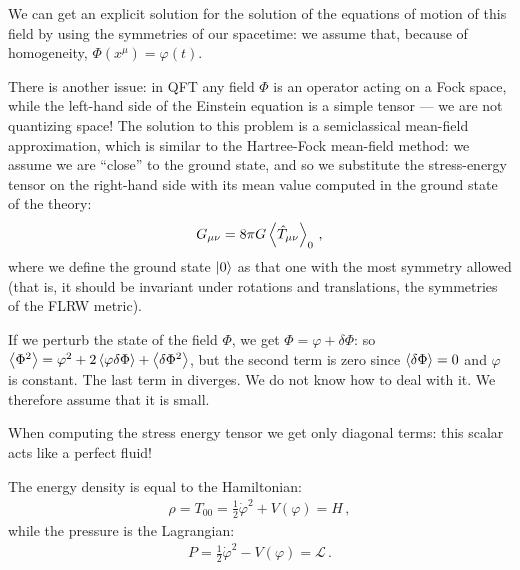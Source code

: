 \documentclass[main.tex]{subfiles}
\begin{document}



We can get an explicit solution for the solution of the equations of motion of this field by using the symmetries of our spacetime: we assume that, because of homogeneity, \(\Phi (x^{\mu }) = \varphi (t)\).

There is another issue: in QFT any field \(\Phi \) is an operator acting on a Fock space, while the left-hand side of the Einstein equation is a simple tensor --- we are not quantizing space!
The solution to this problem is a semiclassical mean-field approximation, which is similar to the Hartree-Fock mean-field method: 
we assume we are ``close'' to the ground state, and so we substitute the stress-energy tensor on the right-hand side with its mean value computed in the ground state of the theory:
%
\begin{align}
  G_{\mu \nu } = 8 \pi G \expval{\hat{T}_{\mu \nu } }_{0}
\,,
\end{align}
%
where we define the ground state \(\ket{0}\) as that one with the most symmetry allowed (that is, it should be invariant under rotations and translations, the symmetries of the FLRW metric).


If we perturb the state of the field \(\Phi \), we get \(\Phi = \varphi + \delta \Phi \): so \(\expval{\Phi^2 } = \varphi^2 + 2 \expval{\varphi \delta \Phi } + \expval{ \delta \Phi^2}\), but the second term is zero since \(\expval{ \delta \Phi } = 0 \) and \(\varphi \) is constant.
The last term in diverges. We do not know how to deal with it.
We therefore assume that it is small.

When computing the stress energy tensor we get only diagonal terms: this scalar acts like a perfect fluid!

The energy density is equal to the Hamiltonian:
%
\begin{align}
  \rho = T_{00 } = \frac{1}{2} \dot{\varphi }^2 + V(\varphi ) = H
\,,
\end{align}
%
while the pressure is the Lagrangian: 
%
\begin{align}
  P = \frac{1}{2} \dot{\varphi}^2 - V(\varphi ) = \mathscr{L}
\,.
\end{align}
\end{document}
